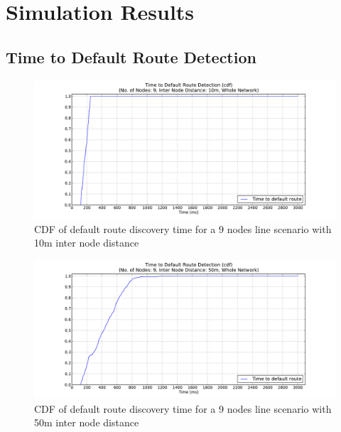 \chapter{Simulation Results}

\section{Time to Default Route Detection}
\label{Appx:cdf}

\begin{figure}[htbp]
  \begin{center}
  \hspace{-20pt}
    \leavevmode
      \includegraphics[width=\textwidth]
      {Pics/results/9/MRHOF/line/dist10_montecarlo_cdf_hist.pdf}
   \caption{CDF of default route discovery time for a 9 nodes line scenario with 10m inter node distance}
   \label{fig:9_MRHOF_line_10_cdf}
  \end{center}
  \vspace{-10pt}
\end{figure}

\begin{figure}[htbp]
  \begin{center}
  \hspace{-20pt}
    \leavevmode
        \includegraphics[width=\textwidth]
      {Pics/results/9/MRHOF/line/dist50_montecarlo_cdf_hist.pdf}
   \caption{CDF of default route discovery time for a 9 nodes line scenario with 50m inter node distance}
   \label{fig:9_MRHOF_line_50_cdf}
  \end{center}
  \vspace{-10pt}
\end{figure}

